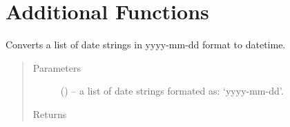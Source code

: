 \documentclass[letterpaper,10pt,openany,oneside,english]{sphinxmanual}
\begin{document}
\section{Additional  Functions}
\label{\detokenize{additional_functions::doc}}\label{\detokenize{additional_functions:additional-fredpy-functions}}

\begin{fulllineitems}
\label{\detokenize{additional_functions:fredpy.date_times}}
Converts a list of date strings in yyyy-mm-dd format to datetime.
\begin{quote}\begin{description}
\item[{Parameters}] \leavevmode
{} (\href{https://docs.python.org/2/library/functions.html\#list}{}) -- a list of date strings formated as: `yyyy-mm-dd'.

\item[{Returns}] \leavevmode
{}

\end{description}\end{quote}

\end{fulllineitems}

\end{document}
